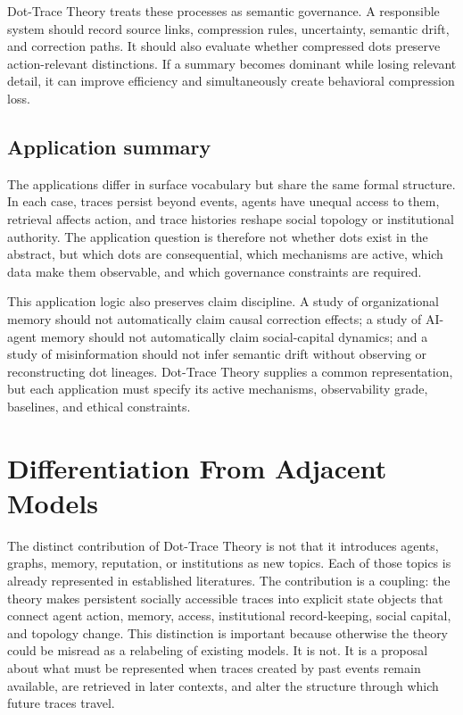 \documentclass[11pt]{article}
\theoremstyle{remark}
\begin{document}
Dot-Trace Theory treats these processes as semantic governance. A responsible system should record source links, compression rules, uncertainty, semantic drift, and correction paths. It should also evaluate whether compressed dots preserve action-relevant distinctions. If a summary becomes dominant while losing relevant detail, it can improve efficiency and simultaneously create behavioral compression loss.

\subsection{Application summary}\label{application-summary}

The applications differ in surface vocabulary but share the same formal structure. In each case, traces persist beyond events, agents have unequal access to them, retrieval affects action, and trace histories reshape social topology or institutional authority. The application question is therefore not whether dots exist in the abstract, but which dots are consequential, which mechanisms are active, which data make them observable, and which governance constraints are required.

This application logic also preserves claim discipline. A study of organizational memory should not automatically claim causal correction effects; a study of AI-agent memory should not automatically claim social-capital dynamics; and a study of misinformation should not infer semantic drift without observing or reconstructing dot lineages. Dot-Trace Theory supplies a common representation, but each application must specify its active mechanisms, observability grade, baselines, and ethical constraints.

\section{Differentiation From Adjacent Models}\label{differentiation-from-adjacent-models}

The distinct contribution of Dot-Trace Theory is not that it introduces agents, graphs, memory, reputation, or institutions as new topics. Each of those topics is already represented in established literatures. The contribution is a coupling: the theory makes persistent socially accessible traces into explicit state objects that connect agent action, memory, access, institutional record-keeping, social capital, and topology change. This distinction is important because otherwise the theory could be misread as a relabeling of existing models. It is not. It is a proposal about what must be represented when traces created by past events remain available, are retrieved in later contexts, and alter the structure through which future traces travel.
\end{document}

